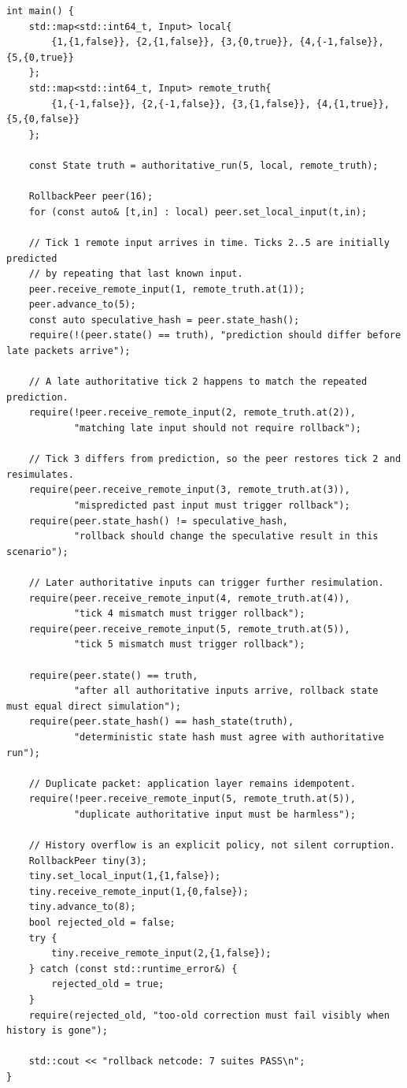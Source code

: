 \begin{verbatim}
int main() {
    std::map<std::int64_t, Input> local{
        {1,{1,false}}, {2,{1,false}}, {3,{0,true}}, {4,{-1,false}}, {5,{0,true}}
    };
    std::map<std::int64_t, Input> remote_truth{
        {1,{-1,false}}, {2,{-1,false}}, {3,{1,false}}, {4,{1,true}}, {5,{0,false}}
    };

    const State truth = authoritative_run(5, local, remote_truth);

    RollbackPeer peer(16);
    for (const auto& [t,in] : local) peer.set_local_input(t,in);

    // Tick 1 remote input arrives in time. Ticks 2..5 are initially predicted
    // by repeating that last known input.
    peer.receive_remote_input(1, remote_truth.at(1));
    peer.advance_to(5);
    const auto speculative_hash = peer.state_hash();
    require(!(peer.state() == truth), "prediction should differ before late packets arrive");

    // A late authoritative tick 2 happens to match the repeated prediction.
    require(!peer.receive_remote_input(2, remote_truth.at(2)),
            "matching late input should not require rollback");

    // Tick 3 differs from prediction, so the peer restores tick 2 and resimulates.
    require(peer.receive_remote_input(3, remote_truth.at(3)),
            "mispredicted past input must trigger rollback");
    require(peer.state_hash() != speculative_hash,
            "rollback should change the speculative result in this scenario");

    // Later authoritative inputs can trigger further resimulation.
    require(peer.receive_remote_input(4, remote_truth.at(4)),
            "tick 4 mismatch must trigger rollback");
    require(peer.receive_remote_input(5, remote_truth.at(5)),
            "tick 5 mismatch must trigger rollback");

    require(peer.state() == truth,
            "after all authoritative inputs arrive, rollback state must equal direct simulation");
    require(peer.state_hash() == hash_state(truth),
            "deterministic state hash must agree with authoritative run");

    // Duplicate packet: application layer remains idempotent.
    require(!peer.receive_remote_input(5, remote_truth.at(5)),
            "duplicate authoritative input must be harmless");

    // History overflow is an explicit policy, not silent corruption.
    RollbackPeer tiny(3);
    tiny.set_local_input(1,{1,false});
    tiny.receive_remote_input(1,{0,false});
    tiny.advance_to(8);
    bool rejected_old = false;
    try {
        tiny.receive_remote_input(2,{1,false});
    } catch (const std::runtime_error&) {
        rejected_old = true;
    }
    require(rejected_old, "too-old correction must fail visibly when history is gone");

    std::cout << "rollback netcode: 7 suites PASS\n";
}
\end{verbatim}

